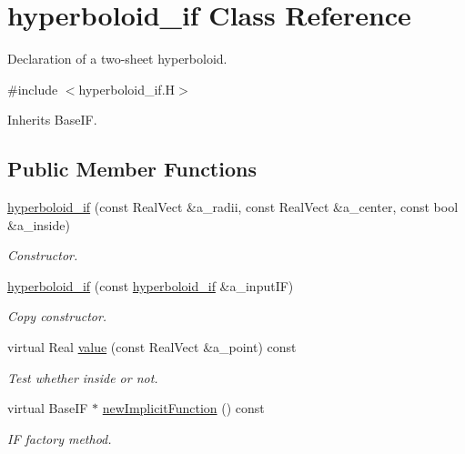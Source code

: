 \hypertarget{classhyperboloid__if}{}\section{hyperboloid\+\_\+if Class Reference}
\label{classhyperboloid__if}


Declaration of a two-\/sheet hyperboloid.  




{\ttfamily \#include $<$hyperboloid\+\_\+if.\+H$>$}



Inherits Base\+IF.

\subsection*{Public Member Functions}
\begin{DoxyCompactItemize}
\item 
\hyperlink{classhyperboloid__if_a49a8d1de1c8f9b266c585cb8b217c807}{hyperboloid\+\_\+if} (const Real\+Vect \&a\+\_\+radii, const Real\+Vect \&a\+\_\+center, const bool \&a\+\_\+inside)
\begin{DoxyCompactList}\small\item\em Constructor. \end{DoxyCompactList}\item 
\hyperlink{classhyperboloid__if_a72a3a80d39136b2e70cc058fd23dcdc0}{hyperboloid\+\_\+if} (const \hyperlink{classhyperboloid__if}{hyperboloid\+\_\+if} \&a\+\_\+input\+IF)
\begin{DoxyCompactList}\small\item\em Copy constructor. \end{DoxyCompactList}\item 
virtual Real \hyperlink{classhyperboloid__if_ad58dd680fd0b7718d367871a006b0925}{value} (const Real\+Vect \&a\+\_\+point) const 
\begin{DoxyCompactList}\small\item\em Test whether inside or not. \end{DoxyCompactList}\item 
virtual Base\+IF $\ast$ \hyperlink{classhyperboloid__if_a40cb40607196cb3342795cb36c7d6662}{new\+Implicit\+Function} () const 
\begin{DoxyCompactList}\small\item\em IF factory method. \end{DoxyCompactList}\end{DoxyCompactItemize}
